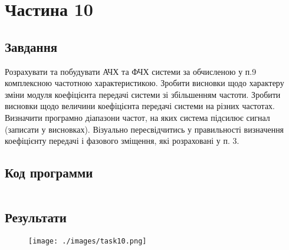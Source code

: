 \section{Частина 10}
\label{sec:task10}

\subsection{Завдання}
\label{subsec:task10_task}

Розрахувати та побудувати АЧХ та ФЧХ системи за обчисленою у п.9
комплексною частотною характеристикою. Зробити висновки щодо
характеру зміни модуля коефіцієнта передачі системи зі збільшенням частоти.
Зробити висновки щодо величини коефіцієнта передачі системи на різних
частотах. Визначити програмно діапазони частот, на яких система підсилює
сигнал (записати у висновках). Візуально пересвідчитись у правильності
визначення коефіцієнту передачі і фазового зміщення, які розраховані у п. 3.

\subsection{Код программи}
\label{subsec:task10_code}
\inputminted{python}{../src/task10.py}

\subsection{Результати}
\label{subsec:task10_results}

\begin{figure}[!ht]
    \centering
    \texttt{[image: ./images/task10.png]}
\end{figure}
